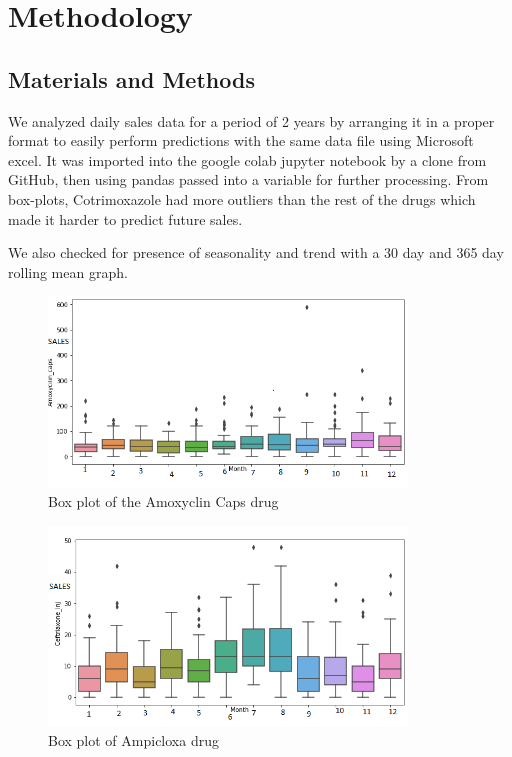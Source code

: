\documentclass[12pt]{report}
\begin{document}
\chapter{Methodology}



\section{Materials and Methods}

We analyzed daily sales data for a period of 2 years by arranging it in a proper format to easily perform predictions with the same data file using Microsoft excel. 
It was imported into the google colab jupyter notebook by a clone from GitHub, then using pandas passed into a variable for further processing.
From box-plots, Cotrimoxazole had more outliers than the rest of the drugs which made it harder to predict future sales.
 
 We also checked for presence of seasonality and trend with a 30 day and 365 day rolling mean graph. 


\begin{figure}[H]%
  \begin {center}
  \includegraphics[width=0.85\textwidth]{images/downloadA.png}
  \caption{Box plot of the Amoxyclin Caps drug}
  \label{fig:ecg}
  \end {center}
\end{figure}

\begin{figure}[H]%
  \begin {center}
  \includegraphics[width=0.85\textwidth]{images/downloadB.png}
  \caption{Box plot of Ampicloxa drug}
  \label{fig:ecg}
  \end {center}
\end{figure}
\end{document}
